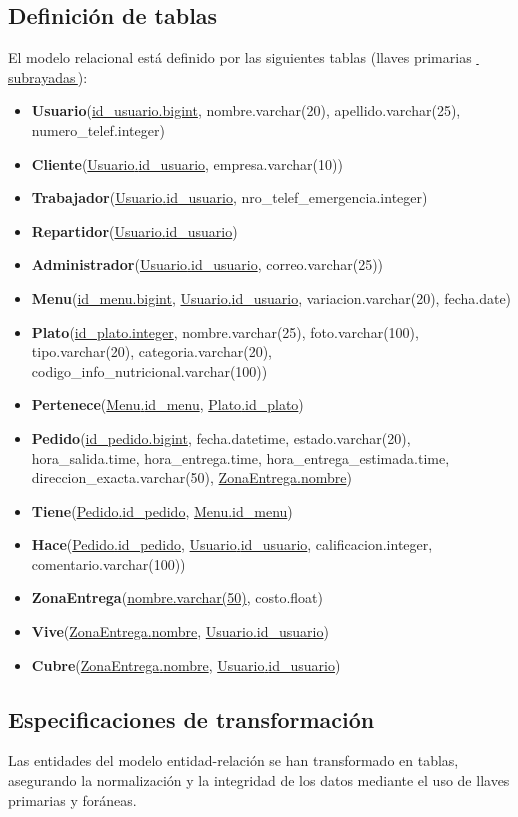 \documentclass[12pt,a4paper]{article}
\newcommand{\relname}[1]{\textcolor{green!60!black}{#1}}
\newcommand{\attr}[1]{\textcolor{blue!70!black}{#1}}
\newcommand{\rel}[1]{\textbf{\textcolor{green!70!black}{#1}}}
\newcommand{\pk}[1]{\uline{\textcolor{green!60!black}{#1}}}
\newcommand{\fk}[2]{\uline{\relname{#1}.\attr{#2}}}
\begin{document}
\subsection{Definición de tablas}

El modelo relacional está definido por las siguientes tablas
(llaves primarias \pk{\,subrayadas\,}):

\begin{itemize}\setlength\itemsep{0.3em}
  \item \rel{Usuario}(\pk{id\_usuario.bigint}, nombre.varchar(20), apellido.varchar(25), numero\_telef.integer)
  \item \rel{Cliente}(\fk{Usuario}{id\_usuario}, empresa.varchar(10))
  \item \rel{Trabajador}(\fk{Usuario}{id\_usuario}, nro\_telef\_emergencia.integer)
  \item \rel{Repartidor}(\fk{Usuario}{id\_usuario})
  \item \rel{Administrador}(\fk{Usuario}{id\_usuario}, correo.varchar(25))
  \item \rel{Menu}(\pk{id\_menu.bigint}, \fk{Usuario}{id\_usuario}, variacion.varchar(20), fecha.date)
  \item \rel{Plato}(\pk{id\_plato.integer}, nombre.varchar(25), foto.varchar(100), tipo.varchar(20), categoria.varchar(20), codigo\_info\_nutricional.varchar(100))
  \item \rel{Pertenece}(\fk{Menu}{id\_menu}, \fk{Plato}{id\_plato})
  \item \rel{Pedido}(\pk{id\_pedido.bigint}, fecha.datetime, estado.varchar(20), hora\_salida.time, hora\_entrega.time, hora\_entrega\_estimada.time, direccion\_exacta.varchar(50), \fk{ZonaEntrega}{nombre})
  \item \rel{Tiene}(\fk{Pedido}{id\_pedido}, \fk{Menu}{id\_menu})
  \item \rel{Hace}(\fk{Pedido}{id\_pedido}, \fk{Usuario}{id\_usuario}, calificacion.integer, comentario.varchar(100))
  \item \rel{ZonaEntrega}(\pk{nombre.varchar(50)}, costo.float)
  \item \rel{Vive}(\fk{ZonaEntrega}{nombre}, \fk{Usuario}{id\_usuario})
  \item \rel{Cubre}(\fk{ZonaEntrega}{nombre}, \fk{Usuario}{id\_usuario})
\end{itemize}

\subsection{Especificaciones de transformación}
Las entidades del modelo entidad-relación se han transformado en tablas, asegurando la normalización y la integridad de los datos mediante el uso de llaves primarias y foráneas.
\end{document}
